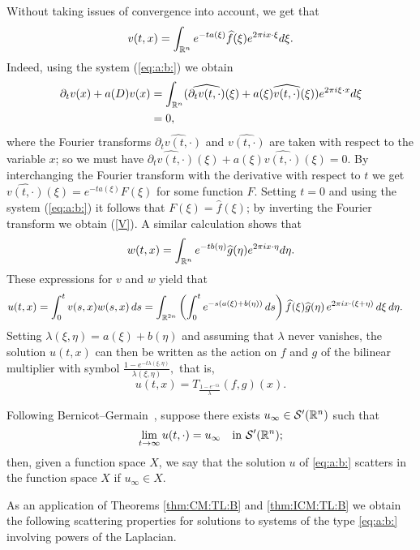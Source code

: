 Without taking issues of convergence into account, we get that 
\begin{equation}\label{V}
v(t,x) = \int_{{\mathbb R}^n} e^{-ta(\xi)} \widehat{f}(\xi)e^{2\pi i x\cdot \xi} d\xi.
\end{equation}
Indeed, using the system (\ref{eq:a:b:}) we obtain
\begin{align*}
\partial_t v(x) +a(D) v(x) &= \int_{{\mathbb R}^n} (\widehat{\partial_t v(t,\cdot)}(\xi) + a(\xi)\widehat{v(t,\cdot)}(\xi))e^{2\pi i \xi \cdot x} d\xi \\
&=0,
\end{align*}
where the Fourier transforms $\widehat{\partial_t v(t,\cdot)}$ and $\widehat{v(t,\cdot)}$ are taken with respect to the variable $x$; 
so we must have $\widehat{\partial_t v(t,\cdot)}(\xi) + a(\xi)\widehat{v(t,\cdot)}(\xi) = 0$. By interchanging the Fourier transform with the derivative with respect to $t$ we get $\widehat{v(t,\cdot)}(\xi) = e^{-t a(\xi)} F(\xi)$ for some function $F$. Setting $t=0$ and using the system (\ref{eq:a:b:}) it follows that $F(\xi) = \widehat{f}(\xi)$; by inverting the Fourier transform we obtain (\ref{V}). A similar calculation shows that $$w(t,x) = \int_{{\mathbb R}^n} e^{-tb(\eta)} \widehat{g}(\eta) e^{2\pi i x\cdot \eta} d\eta.$$
These expressions for $v$ and $w$ yield that
\begin{align*}
u(t,x) & = \int_0^t v(s,x) w(s,x) \,ds  = \int_{\mathbb{R}^{2n}} \left(\int_0^t e^{-s (a(\xi)+b(\eta))} \,ds \right) \widehat{f}(\xi) \widehat{g}(\eta) \, e^{2\pi i x \cdot (\xi + \eta)} \, d\xi\, d\eta.
\end{align*}
Setting $\lambda(\xi,\eta)=a(\xi)+b(\eta)$ and assuming that $\lambda$ never vanishes, the solution $u(t,x)$ can then be written as the action on $f$ and $g$ of the bilinear multiplier  with symbol $\frac{1-e^{-t\lambda(\xi,\eta)}}{\lambda(\xi,\eta)},$ that is,  
\begin{equation}\label{u:T:lambda}
u(t,x) = T_{\frac{1-e^{-t\lambda}}{\lambda}}(f,g)(x).
\end{equation}

Following Bernicot--Germain~\cite[Section 9.4]{MR2680189}, suppose there exists   $u_\infty\in {\mathcal{S}'}({{\mathbb R}^n})$ such that 
\begin{equation}\label{def:u:infty}
\lim\limits_{t \to \infty} u(t, \cdot ) = u_\infty \quad \text{in } {\mathcal{S}'}({{\mathbb R}^n});
\end{equation}
then, given a function space $X$, we say that the solution $u$ of  \eqref{eq:a:b:} scatters in the function space $X$ if $u_\infty \in X.$

As an application of Theorems \ref{thm:CM:TL:B} and \ref{thm:ICM:TL:B} we obtain the following scattering properties for solutions to  systems of the type \eqref{eq:a:b:} involving powers of the Laplacian. 

